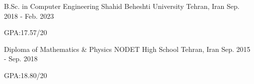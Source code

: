 

\begin{cventries}

  \cventry%
    {B.Sc. in Computer Engineering} %
    {Shahid Beheshti University} %
    {Tehran, Iran} %
    {Sep. 2018 - Feb. 2023} %
    {%
      \begin{cvitems} %
        \item {GPA:\@ 17.57/20}
      \end{cvitems}
    }


  \cventry%
    {Diploma of Mathematics \& Physics} %
    {NODET High School} %
    {Tehran, Iran} %
    {Sep. 2015 - Sep. 2018} %
    {%
      \begin{cvitems} %
        \item {GPA:\@ 18.80/20}
      \end{cvitems}
    }



\end{cventries}
